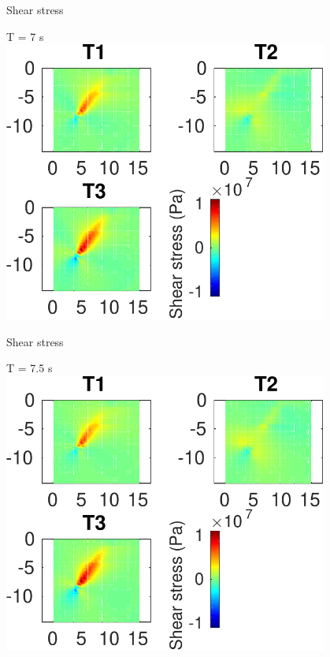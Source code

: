 \documentclass{beamer}
\begin{document}
\begin{frame}
 {Shear stress}
 
 \centering \Large T = 7 s\\
 \includegraphics[width=0.8\textwidth]{images/vertical_00076}
 
\end{frame}

\begin{frame}
 {Shear stress}
 
 \centering \Large T = 7.5 s\\
 \includegraphics[width=0.8\textwidth]{images/vertical_00081}
 
\end{frame}
\end{document}
